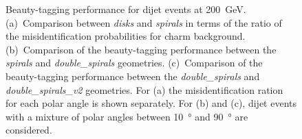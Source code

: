 \begin{figure}[htbp]
\begin{subfigure}[b]{0.33\textwidth}
    \caption{}
    \label{fig:doubleSpirals_doubleSpirals}
  \end{subfigure}
  \caption{Beauty-tagging performance for dijet events at
    \SI{200}{\giga\electronvolt}. (a)~Comparison between \emph{disks}
    and \emph{spirals} in terms of the ratio of the misidentification
    probabilities for charm background. (b)~Comparison of the
    beauty-tagging performance between the \emph{spirals} and
    \emph{double\_spirals} geometries. (c)~Comparison of the
    beauty-tagging performance between the \emph{double\_spirals} and
    \emph{double\_spirals\_v2} geometries. For (a) the
    misidentification ration for each polar angle is shown
    separately. For (b) and (c), dijet events with a mixture of polar
    angles between \SI{10}{\degree} and \SI{90}{\degree} are
    considered.}
  \label{fig:performance}
\end{figure}

